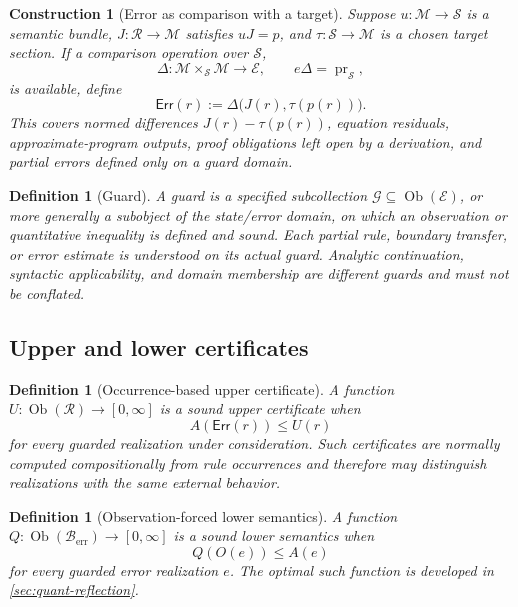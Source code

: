 \documentclass[12pt,a4paper,twoside]{extarticle}
\theoremstyle{compactplain}
\theoremstyle{compactdef}
\newtheorem{definition}[theorem]{Definition}
\newtheorem{construction}[theorem]{Construction}
\newcommand{\Err}{\mathsf{Err}}
\begin{document}
\begin{construction}[Error as comparison with a target]
Suppose $u:\mathcal M\to\mathcal S$ is a semantic bundle, $J:\mathcal R\to\mathcal M$ satisfies $uJ=p$, and $\tau:\mathcal S\to\mathcal M$ is a chosen target section.  If a comparison operation over $\mathcal S$,
\[
  \Delta:\mathcal M\times_{\mathcal S}\mathcal M\longrightarrow\mathcal E,
  \qquad e\Delta=\operatorname{pr}_{\mathcal S},
\]
is available, define
\[
  \Err(r):=\Delta\bigl(J(r),\tau(p(r))\bigr).
\]
This covers normed differences $J(r)-\tau(p(r))$, equation residuals, approximate-program outputs, proof obligations left open by a derivation, and partial errors defined only on a guard domain.
\end{construction}

\begin{definition}[Guard]
A guard is a specified subcollection $\mathcal G\subseteq\operatorname{Ob}(\mathcal E)$, or more generally a subobject of the state/error domain, on which an observation or quantitative inequality is defined and sound.  Each partial rule, boundary transfer, or error estimate is understood on its actual guard.  Analytic continuation, syntactic applicability, and domain membership are different guards and must not be conflated.
\end{definition}

\subsection{Upper and lower certificates}
\begin{definition}[Occurrence-based upper certificate]
A function $U:\operatorname{Ob}(\mathcal R)\to[0,\infty]$ is a sound upper certificate when
\[
  A(\Err(r))\le U(r)
\]
for every guarded realization under consideration.  Such certificates are normally computed compositionally from rule occurrences and therefore may distinguish realizations with the same external behavior.
\end{definition}

\begin{definition}[Observation-forced lower semantics]
A function $Q:\operatorname{Ob}(\mathcal B_{\mathrm{err}})\to[0,\infty]$ is a sound lower semantics when
\[
  Q(O(e))\le A(e)
\]
for every guarded error realization $e$.  The optimal such function is developed in \cref{sec:quant-reflection}.
\end{definition}
\end{document}
